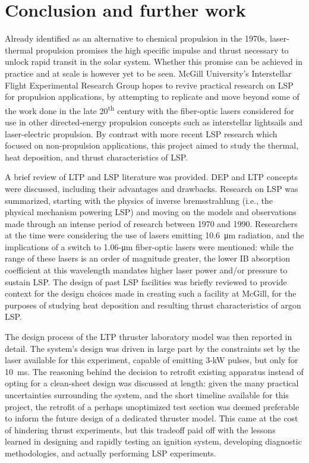 \chapter{Conclusion and further work}
    Already identified as an alternative to chemical propulsion in the 1970s, laser-thermal propulsion promises the high specific impulse and thrust necessary to unlock rapid transit in the solar system. Whether this promise can be achieved in practice and at scale is however yet to be seen. McGill University's Interstellar Flight Experimental Research Group hopes to revive practical research on LSP for propulsion applications, by attempting to replicate and move beyond some of the work done in the late 20\textsuperscript{th} century with the fiber-optic lasers considered for use in other directed-energy propulsion concepts such as interstellar lightsails and laser-electric propulsion. By contrast with more recent LSP research which focused on non-propulsion applications, this project aimed to study the thermal, heat deposition, and thrust characteristics of LSP.

    A brief review of LTP and LSP literature was provided. DEP and LTP concepts were discussed, including their advantages and drawbacks. Research on LSP was summarized, starting with the physics of inverse bremsstrahlung (i.e., the physical mechanism powering LSP) and moving on the models and observations made through an intense period of research between 1970 and 1990. Researchers at the time were considering the use of  lasers emitting \qty{10.6}{\um} radiation, and the implications of a switch to \num{1.06}-\unit{\um} fiber-optic lasers were mentioned: while the range of these lasers is an order of magnitude greater, the lower IB absorption coefficient at this wavelength mandates higher laser power and/or pressure to sustain LSP. The design of past LSP facilities was briefly reviewed to provide context for the design choices made in creating such a facility at McGill, for the purposes of studying heat deposition and resulting thrust characteristics of argon LSP.

    The design process of the LTP thruster laboratory model was then reported in detail. The system's design was driven in large part by the constraints set by the laser available for this experiment, capable of emitting \num{3}-\unit{kW} pulses, but only for \qty{10}{ms}. The reasoning behind the decision to retrofit existing apparatus instead of opting for a clean-sheet design was discussed at length: given the many practical uncertainties surrounding the system, and the short timeline available for this project, the retrofit of a perhaps unoptimized test section was deemed preferable to inform the future design of a dedicated thruster model. This came at the cost of hindering thrust experiments, but this tradeoff paid off with the lessons learned in designing and rapidly testing an ignition system, developing diagnostic methodologies, and actually performing LSP experiments.

